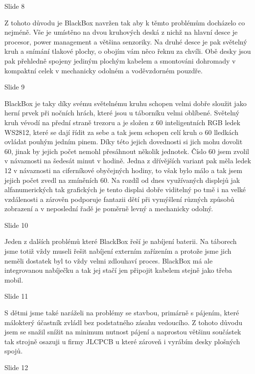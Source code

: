 Slide 8

Z tohoto důvodu je BlackBox navržen tak aby k těmto problémům docházelo co nejméně. 
Vše je umístěno na dvou kruhových deská z nichž na hlavní desce je procesor, power management a většina
senzoriky. Na druhé desce je pak světelný kruh a snímání tlakové plochy, o obojím vám něco řeknu za chvíli.
Obě desky jsou pak přehledně spojeny jediným plochým kabelem a smontováni dohromady v kompaktní celek 
v mechanicky odolném a voděvzdorném pouzdře. %

Slide 9

BlackBox je taky díky svému světelnému kruhu schopen velmi dobře sloužit jako herní prvek při nočních hrách,
které jsou u táborníku velmi oblíbené.
Světelný kruh vévodí na přední straně trezoru a je složen z 60 inteligentních RGB ledek WS2812, které 
se dají řídit za sebe a tak jsem schopen celí kruh o 60 lledkách ovládat pouhým jedním pinem. Díky této jejich dovednosti si jich mohu dovolit 60,
jinak by jejich počet nemohl přesáhnout několik jednotek. Číslo 60 jsem zvolil v návaznosti na šedesát 
minut v hodině. Jedna z dřívějších variant pak měla ledek 12 v návaznosti 
na ciferníkové obyčejných hodiny,
to však bylo málo a tak jsem jejich počet zvedl na zmíněních 60.
Na rozdíl od dnes využívaných displejů jak alfanumerických tak grafických je tento displai dobře viditelný po tmě i na velké vzdálenosti 
a zárověn podporuje fantazii dětí při vymýšlení různých způsobů zobrazení a v neposlední řadě je poměrně levný a mechanicky odolný. %



Slide 10

Jeden z dalších problémů které BlackBox řeší je nabíjení baterii. Na táborech jsme totiž vždy museli
řešit nabíjení externím zařízením a protože jsme jich neměli dostatek byl to vždy velmi zdlouhaví proces.
BlackBox má ale integrovanou nabíječku a tak jej stačí jen připojit kabelem stejně jako třeba mobil.

Slide 11

S dětmi jsme také naráželi na problémy se stavbou, primárně s pájením, které málokterý 
účastník zvládl bez podstatného zásahu vedoucího. Z tohoto důvodu jsem se snažil snížit na minimum 
nutnost pájení a naprostou většinu součástek tak strojně osazuji u firmy JLCPCB u které zároveň i vyrábím 
desky plošných spojů.



Slide 12

